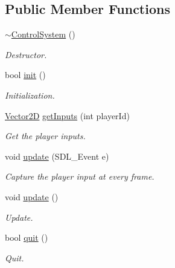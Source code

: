 \subsection*{Public Member Functions}
\begin{DoxyCompactItemize}
\item 
\mbox{\label{class_control_system_a449890897411186d4f245a79e8f2d016}} 
\mbox{\hyperlink{class_control_system_a449890897411186d4f245a79e8f2d016}{$\sim$\+Control\+System}} ()
\begin{DoxyCompactList}\small\item\em Destructor. \end{DoxyCompactList}\item 
\mbox{\label{class_control_system_a2687cf6157bdef4736fcc7be9a12fc59}} 
bool \mbox{\hyperlink{class_control_system_a2687cf6157bdef4736fcc7be9a12fc59}{init}} ()
\begin{DoxyCompactList}\small\item\em Initialization. \end{DoxyCompactList}\item 
\mbox{\hyperlink{struct_vector2_d}{Vector2D}} \mbox{\hyperlink{class_control_system_ac3cb7e3272ab77ad22d47b157e4cc902}{get\+Inputs}} (int player\+Id)
\begin{DoxyCompactList}\small\item\em Get the player inputs. \end{DoxyCompactList}\item 
void \mbox{\hyperlink{class_control_system_aaa4401e75f3530060fe41c52115bb7f5}{update}} (S\+D\+L\+\_\+\+Event e)
\begin{DoxyCompactList}\small\item\em Capture the player input at every frame. \end{DoxyCompactList}\item 
\mbox{\label{class_control_system_a67acf8c6ff8f4de652bde98dae2555d4}} 
void \mbox{\hyperlink{class_control_system_a67acf8c6ff8f4de652bde98dae2555d4}{update}} ()
\begin{DoxyCompactList}\small\item\em Update. \end{DoxyCompactList}\item 
\mbox{\label{class_control_system_a143b8db58b269cbd7d35abb488fbe290}} 
bool \mbox{\hyperlink{class_control_system_a143b8db58b269cbd7d35abb488fbe290}{quit}} ()
\begin{DoxyCompactList}\small\item\em Quit. \end{DoxyCompactList}\end{DoxyCompactItemize}
